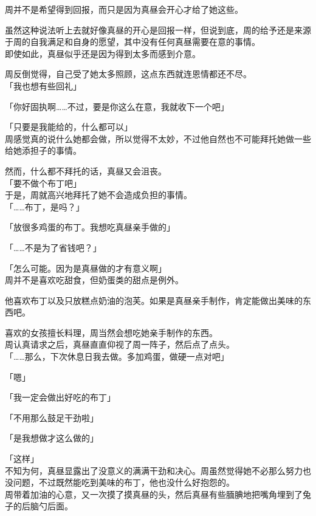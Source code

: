 周并不是希望得到回报，而只是因为真昼会开心才给了她这些。

虽然这种说法听上去就好像真昼的开心是回报一样，但说到底，周的给予还是来源于周的自我满足和自身的愿望，其中没有任何真昼需要在意的事情。\\

即使如此，真昼似乎还是因为得到太多而感到介意。

周反倒觉得，自己受了她太多照顾，这点东西就连恩情都还不尽。\\

「我也想有些回礼」

「你好固执啊……不过，要是你这么在意，我就收下一个吧」

「只要是我能给的，什么都可以」\\

周感觉真的说什么她都会做，所以觉得不太妙，不过他自然也不可能拜托她做一些给她添担子的事情。

然而，什么都不拜托的话，真昼又会沮丧。\\

「要不做个布丁吧」\\

于是，周就高兴地拜托了她不会造成负担的事情。\\

「……布丁，是吗？」

「放很多鸡蛋的布丁。我想吃真昼亲手做的」

「……不是为了省钱吧？」

「怎么可能。因为是真昼做的才有意义啊」\\

周并不是喜欢吃甜食，但奶蛋类的甜点是例外。

他喜欢布丁以及只放糕点奶油的泡芙。如果是真昼亲手制作，肯定能做出美味的东西吧。

喜欢的女孩擅长料理，周当然会想吃她亲手制作的东西。\\

周认真请求之后，真昼直直仰视了周一阵子，然后点了点头。\\

「……那么，下次休息日我去做。多加鸡蛋，做硬一点对吧」

「嗯」

「我一定会做出好吃的布丁」

「不用那么鼓足干劲啦」

「是我想做才这么做的」

「这样」\\

不知为何，真昼显露出了没意义的满满干劲和决心。周虽然觉得她不必那么努力也没问题，不过既然能吃到美味的布丁，他也没什么好抱怨的。\\

周带着加油的心意，又一次摸了摸真昼的头，然后真昼有些腼腆地把嘴角埋到了兔子的后脑勺后面。

